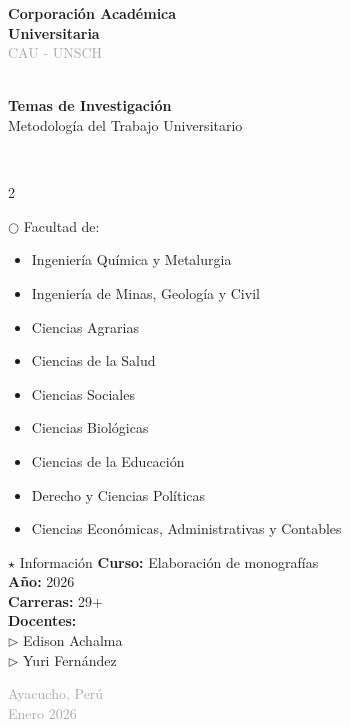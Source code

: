 \documentclass[12pt,a4paper]{article}
\begin{document}
\begin{titlepage}
  \centering
  \vspace*{1cm}
  
  {\Huge\bfseries\textcolor{primaryblue}{Corporación Académica\\Universitaria}}\\[0.5cm]
  \textcolor{darkgray}{\large CAU - UNSCH}\\[2.5cm]
  
  \\[0.5cm]
  
  {\Huge\bfseries\textcolor{secondaryblue}{Temas de Investigación}}\\[0.3cm]
  {\LARGE\textcolor{accentgold}{Metodología del Trabajo Universitario}}\\[0.5cm]
  
  \\[2cm]
  
  \begin{multicols}{2}
  \begin{infobox}{$\bigcirc$ Facultad de:}
    \begin{itemize}
      \item Ingeniería Química y Metalurgia
      \item Ingeniería de Minas, Geología y Civil
      \item Ciencias Agrarias
      \item Ciencias de la Salud
      \item Ciencias Sociales
      \item Ciencias Biológicas
      \item Ciencias de la Educación
      \item Derecho y Ciencias Políticas
      \item Ciencias Económicas, Administrativas y Contables
    \end{itemize}
  \end{infobox}
  
  \columnbreak
  
  \begin{infobox}{$\star$ Información}
    \textbf{Curso:} Elaboración de monografías\\
    \textbf{Año:} 2026\\
    \textbf{Carreras:} 29+\\
    \textbf{Docentes:}\\
    $\triangleright$ Edison Achalma \\
    $\triangleright$ Yuri Fernández 
  \end{infobox}
  \end{multicols}
  
  \vfill
  
      {\large\textcolor{darkgray}{Ayacucho, Perú\\Enero 2026}}
\end{titlepage}
\end{document}
